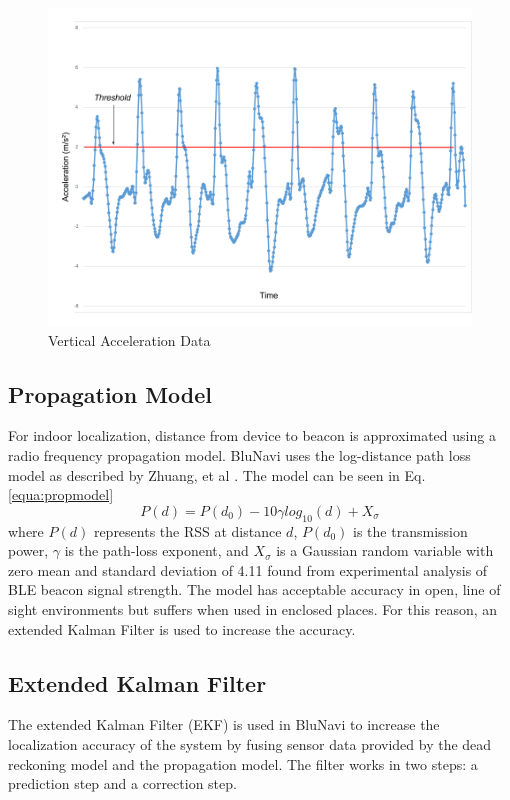 \documentclass[conference]{IEEEtran}
\begin{document}
\begin{figure}[h]
\centering
\includegraphics[scale=0.25]{AccelerometerGraph.png}
\caption{Vertical Acceleration Data}
\captionsetup{justification=centering,margin=2cm}
\label{fig:accgraph}
\end{figure}

\subsection{Propagation Model}
For indoor localization, distance from device to beacon is approximated using a radio frequency propagation model. BluNavi uses the log-distance path loss model as described by Zhuang, et al \cite{zhuang2016smartphone}. The model can be seen in Eq. \ref{equa:propmodel}
\begin{equation}
\label{equa:propmodel}
P(d) = P(d_0) - 10{\gamma}log_{10}(d) + X_\sigma
\end{equation}
where $P(d)$ represents the RSS at distance $d$, $P(d_0)$ is the transmission power, $\gamma$ is the path-loss exponent, and $X_\sigma$ is a Gaussian random variable with zero mean and standard deviation of 4.11 found from experimental analysis of BLE beacon signal strength. The model has acceptable accuracy in open, line of sight environments but suffers when used in enclosed places. For this reason, an extended Kalman Filter is used to increase the accuracy.

\subsection{Extended Kalman Filter}
The extended Kalman Filter (EKF) is used in BluNavi to increase the localization accuracy of the system by fusing sensor data provided by the dead reckoning model and the propagation model. The filter works in two steps: a prediction step and a correction step.
\end{document}
